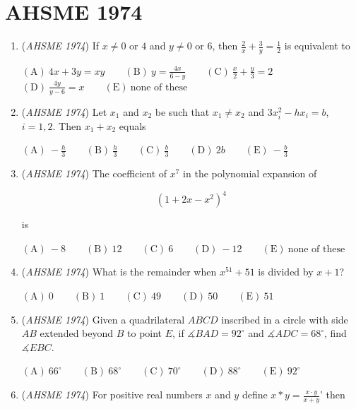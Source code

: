 \section{AHSME 1974}
        \begin{enumerate}
        	\item (\textit{AHSME 1974}) If $x\not=0$ or $4$ and $y\not=0$ or $6$, then $\frac{2}{x}+\frac{3}{y}=\frac{1}{2}$ is equivalent to


 $\mathrm{(A)\ } 4x+3y=xy \qquad \mathrm{(B) \ }y=\frac{4x}{6-y} \qquad \mathrm{(C) \  } \frac{x}{2}+\frac{y}{3}=2 \qquad$
$\mathrm{(D) \  } \frac{4y}{y-6}=x \qquad \mathrm{(E) \  }\text{none of these}$


	\item (\textit{AHSME 1974}) Let $x_1$ and $x_2$ be such that $x_1\not=x_2$ and $3x_i^2-hx_i=b$, $i=1, 2$. Then $x_1+x_2$ equals


 $\mathrm{(A)\ } -\frac{h}{3} \qquad \mathrm{(B) \ }\frac{h}{3} \qquad \mathrm{(C) \  } \frac{b}{3} \qquad \mathrm{(D) \  } 2b \qquad \mathrm{(E) \  }-\frac{b}{3}$


	\item (\textit{AHSME 1974}) The coefficient of $x^7$ in the polynomial expansion of 


 
 \[(1+2x-x^2)^4\]


 is


 $\mathrm{(A)\ } -8 \qquad \mathrm{(B) \ }12 \qquad \mathrm{(C) \  } 6 \qquad \mathrm{(D) \  } -12 \qquad \mathrm{(E) \  }\text{none of these}$


	\item (\textit{AHSME 1974}) What is the remainder when $x^{51}+51$ is divided by $x+1$?


 $\mathrm{(A)\ } 0 \qquad \mathrm{(B) \ }1 \qquad \mathrm{(C) \  } 49 \qquad \mathrm{(D) \  } 50 \qquad \mathrm{(E) \  }51$


	\item (\textit{AHSME 1974}) Given a quadrilateral $ABCD$ inscribed in a circle with side $AB$ extended beyond $B$ to point $E$, if $\measuredangle BAD=92^\circ$ and $\measuredangle ADC=68^\circ$, find $\measuredangle EBC$.


 $\mathrm{(A)\ } 66^\circ \qquad \mathrm{(B) \ }68^\circ \qquad \mathrm{(C) \  } 70^\circ \qquad \mathrm{(D) \  } 88^\circ \qquad \mathrm{(E) \  }92^\circ$


	\item (\textit{AHSME 1974}) For positive real numbers $x$ and $y$ define $x*y=\frac{x\cdot y}{x+y}$' then



\end{enumerate}

